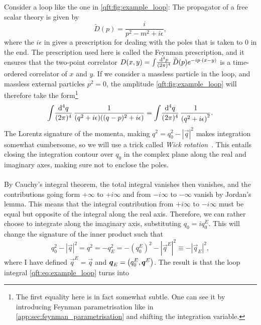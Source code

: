 \documentclass[../main.tex]{subfiles}
\begin{document}
Consider a loop like the one in \cref{qft:fig:example_loop}:
The propagator of a free scalar theory is given by~\cite{Schwartz:2014sze}
\begin{equation}
  \tilde{D}(p) = \frac{i}{p^2 - m^2 + i \epsilon},
\end{equation}
where the \(i\epsilon\) in gives a prescription for dealing with the poles that is taken to 0 in the end.
The prescription used here is called the Feynman prescription, and it ensures that the two-point correlator \(D(x,y) = \int\!\frac{\mathrm{d}^{4}p}{(2\pi)^{4}}\,\tilde{D}(p) e^{-ip\cdot(x-y)}\) is a time-ordered correlator of \(x\) and \(y\).
If we consider a massless particle in the loop, and massless external particles \(p^2 = 0\), the amplitude \cref{qft:fig:example_loop} will therefore take the form\footnote{The first equality here is in fact somewhat subtle. One can see it by introducing Feynman parametrisation like in \cref{app:sec:feynman_parametrisation} and shifting the integration variable.}
\begin{equation}
  \label{qft:eq:example_loop}
  \loopintegral[4]{q} \frac{1}{(q^2+i\epsilon)((q-p)^2+i\epsilon)} = \loopintegral[4]{q} \frac{1}{\pclosed{q^2 + i\epsilon}^2}.
\end{equation}
The Lorentz signature of the momenta, making \(q^2 = q_0^2 - |\vec{q}|^2\) makes integration somewhat cumbersome, so we will use a trick called \emph{Wick rotation}~\cite{Schwartz:2014sze}.
This entails closing the integration contour over \(q_0\) in the complex plane along the real and imaginary axes, making sure not to enclose the poles.
\\\\
By Cauchy's integral theorem, the total integral vanishes then vanishes, and the contributions going form \(+\infty\) to \(+i\infty\) and from \(-i\infty\) to \(-\infty\) vanish by Jordan's lemma.
This means that the integral contribution from \(+i\infty\) to \(-i\infty\) must be equal but opposite of the integral along the real axis.
Therefore, we can rather choose to integrate along the imaginary axis, substituting \(q_0 = iq_0^E\).
This will change the signature of the inner product such that
\begin{equation}
  q_0^2 - |\vec{q}|^2 = q^2 = -q_E^2 = -(q_0^E)^2 - |\vec{q}^E|^2 \equiv -|\vec{q}_E|^2,
\end{equation}
where I have defined \(\vec{q}^E = \vec{q}\) and \(\boldsymbol{q}_E = \left(q_0^E, \boldsymbol{q}^E\right)\).
The result is that the loop integral \cref{qft:eq:example_loop} turns into
\end{document}
